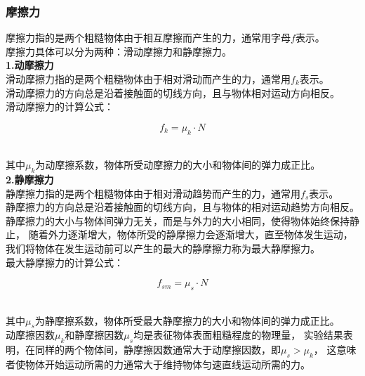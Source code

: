 \documentclass[UTF8]{ctexart}
\begin{document}
\subsubsection{摩擦力}
    摩擦力指的是两个粗糙物体由于相互摩擦而产生的力，通常用字母$f$表示。\\[2mm]
    摩擦力具体可以分为两种：滑动摩擦力和静摩擦力。\\[5mm]
    \textbf{1.动摩擦力}\\[2mm]
    滑动摩擦力指的是两个粗糙物体由于相对滑动而产生的力，通常用$f_k$表示。\\[2mm]
    滑动摩擦力的方向总是沿着接触面的切线方向，且与物体相对运动方向相反。\\[4mm]
    滑动摩擦力的计算公式：
    \begin{large}
        \begin{equation*}
            f_{k}=\mu_k\cdot N
        \end{equation*}
    \end{large}\\
    其中$\mu_k$为动摩擦系数，物体所受动摩擦力的大小和物体间的弹力成正比。\\[8mm]
    \textbf{2.静摩擦力}\\[2mm]
    静摩擦力指的是两个粗糙物体由于相对滑动趋势而产生的力，通常用$f_s$表示。\\[2mm]
    静摩擦力的方向总是沿着接触面的切线方向，且与物体的相对运动趋势方向相反。\\[2mm]
    静摩擦力的大小与物体间弹力无关，而是与外力的大小相同，使得物体始终保持静止，
    随着外力逐渐增大，物体所受的静摩擦力会逐渐增大，直至物体发生运动，
    我们将物体在发生运动前可以产生的最大的静摩擦力称为最大静摩擦力。\\[4mm]
    最大静摩擦力的计算公式：
    \begin{large}
        \begin{equation*}
            f_{sm}=\mu_{s}\cdot N
        \end{equation*}
    \end{large}\\
    其中$\mu_s$为静摩擦系数，物体所受最大静摩擦力的大小和物体间的弹力成正比。\\[4mm]
    动摩擦因数$\mu_k$和静摩擦因数$\mu_s$均是表征物体表面粗糙程度的物理量，
    实验结果表明，在同样的两个物体间，静摩擦因数通常大于动摩擦因数，即$\mu_s>\mu_k$，
    这意味者使物体开始运动所需的力通常大于维持物体匀速直线运动所需的力。

\newpage
\end{document}

